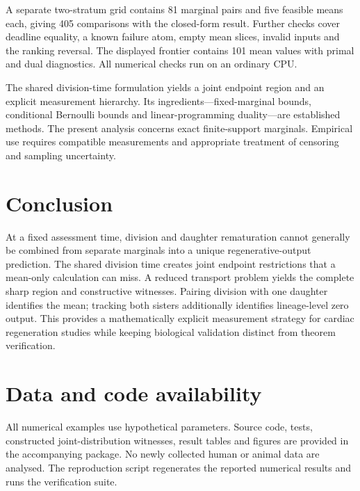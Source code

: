\documentclass[11pt]{article}
\begin{document}
A separate two-stratum grid contains 81 marginal pairs and five feasible means each, giving 405 comparisons with the closed-form result. Further checks cover deadline equality, a known failure atom, empty mean slices, invalid inputs and the ranking reversal. The displayed frontier contains 101 mean values with primal and dual diagnostics. All numerical checks run on an ordinary CPU.

The shared division-time formulation yields a joint endpoint region and an explicit measurement hierarchy. Its ingredients---fixed-marginal bounds, conditional Bernoulli bounds and linear-programming duality---are established methods. The present analysis concerns exact finite-support marginals. Empirical use requires compatible measurements and appropriate treatment of censoring and sampling uncertainty.

\section{Conclusion}
At a fixed assessment time, division and daughter rematuration cannot generally be combined from separate marginals into a unique regenerative-output prediction. The shared division time creates joint endpoint restrictions that a mean-only calculation can miss. A reduced transport problem yields the complete sharp region and constructive witnesses. Pairing division with one daughter identifies the mean; tracking both sisters additionally identifies lineage-level zero output. This provides a mathematically explicit measurement strategy for cardiac regeneration studies while keeping biological validation distinct from theorem verification.

\section*{Data and code availability}
All numerical examples use hypothetical parameters. Source code, tests, constructed joint-distribution witnesses, result tables and figures are provided in the accompanying package. No newly collected human or animal data are analysed. The reproduction script regenerates the reported numerical results and runs the verification suite.
\end{document}
